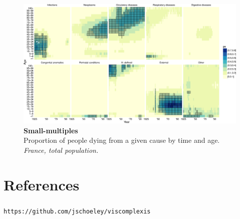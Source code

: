 \documentclass{beamer}
\begin{document}
\begin{frame}
\frametitle{\insertsection}

\begin{figure}[htb!]
\includegraphics[width = \textwidth]{./fig/small_multiples.pdf}\\
\scriptsize \textbf{Small-multiples}\\ Proportion of people dying from a given cause by time and age. \tiny\emph{France, total population.}
\end{figure}

\end{frame}

\section{References} %

\begin{frame}
\frametitle{\insertsection}

\begin{centering}

\Large{}

\smallskip

\Large\texttt{https://github.com/jschoeley/viscomplexis}

\end{centering}

\end{frame}


\begin{frame}
\frametitle{\insertsection}

\nocite{MOLAST2000}

\printbibliography

\end{frame}
\end{document}
